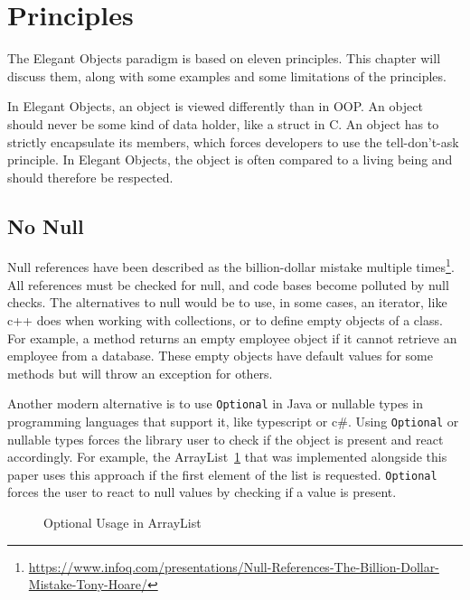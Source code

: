 \section{Principles}\label{sec:principles}
The Elegant Objects paradigm is based on eleven principles.
This chapter will discuss them, along with some examples and some limitations of the principles.

In Elegant Objects, an object is viewed differently than in \Gls{OOP}.
An object should never be some kind of data holder, like a struct in C\@.
An object has to strictly encapsulate its members, which forces developers to use the tell-don't-ask principle.
In Elegant Objects, the object is often compared to a living being and should therefore be respected.\cite{tell-dont-ask-martin-fowler,elegant-objects}

\subsection{No Null}\label{subsec:no-null}
Null references have been described as the billion-dollar mistake multiple times\footnote{\url{https://www.infoq.com/presentations/Null-References-The-Billion-Dollar-Mistake-Tony-Hoare/}}.
All references must be checked for null, and code bases become polluted by null checks.
The alternatives to null would be to use, in some cases, an iterator, like c++ does when working with collections, or to define empty objects of a class.
For example, a method returns an empty employee object if it cannot retrieve an employee from a database.
These empty objects have default values for some methods but will throw an exception for others.

Another modern alternative is to use \texttt{Optional} in Java or nullable types in programming languages that support it, like typescript or c\#.
Using \texttt{Optional} or nullable types forces the library user to check if the object is present and react accordingly.
For example, the ArrayList\ \ref{fig:optional-usage} that was implemented alongside this paper uses this approach if the first element of the list is requested.
\texttt{Optional} forces the user to react to null values by checking if a value is present.

\begin{figure}[h]
    \caption{Optional Usage in ArrayList}
    
    \label{fig:optional-usage}
\end{figure}

